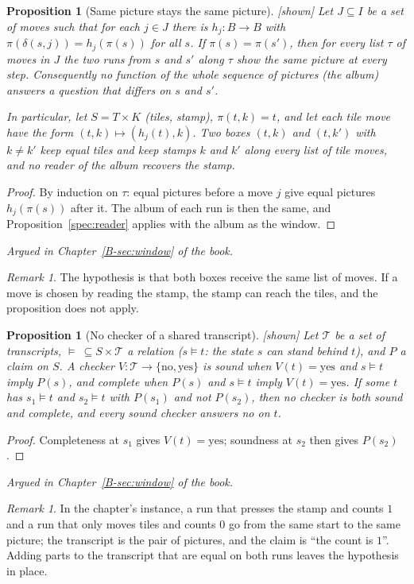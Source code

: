 \documentclass[11pt, a4paper]{article}
\theoremstyle{plain}
\newtheorem{proposition}[theorem]{Proposition}
\theoremstyle{definition}
\theoremstyle{remark}
\newtheorem{remark}[theorem]{Remark}
\newcommand{\Bool}{\{\mathrm{no},\mathrm{yes}\}}
\newcommand{\step}{\delta}
\newcommand{\argued}[1]{\par\noindent\textit{Argued in Chapter~\ref{B-#1} of the book.}\par}
\newcommand{\kind}[1]{\textup{[#1]}}
\begin{document}
\begin{proposition}[Same picture stays the same picture]\label{spec:album} \kind{shown}
Let $J\subseteq I$ be a set of moves such that for each $j\in J$ there is $h_j:B\to B$ with
$\pi(\step(s,j))=h_j(\pi(s))$ for all $s$. If $\pi(s)=\pi(s')$, then for every list $\tau$ of moves in $J$
the two runs from $s$ and $s'$ along $\tau$ show the same picture at every step. Consequently no function
of the whole sequence of pictures (the album) answers a question that differs on $s$ and $s'$.

In particular, let $S=T\times K$ (tiles, stamp), $\pi(t,k)=t$, and let each tile move have the form
$(t,k)\mapsto(h_j(t),k)$. Two boxes $(t,k)$ and $(t,k')$ with $k\ne k'$ keep equal tiles and keep stamps
$k$ and $k'$ along every list of tile moves, and no reader of the album recovers the stamp.
\end{proposition}
\begin{proof}
By induction on $\tau$: equal pictures before a move $j$ give equal pictures $h_j(\pi(s))$ after it. The
album of each run is then the same, and Proposition~\ref{spec:reader} applies with the album as the window.
\end{proof}
\argued{sec:window}

\begin{remark}
The hypothesis is that both boxes receive the same list of moves. If a move is chosen by reading the stamp,
the stamp can reach the tiles, and the proposition does not apply.
\end{remark}

\begin{proposition}[No checker of a shared transcript]\label{spec:transcript} \kind{shown}
Let $\mathcal{T}$ be a set of transcripts, $\models\ \subseteq S\times\mathcal{T}$ a relation ($s\models t$:
the state $s$ can stand behind $t$), and $P$ a claim on $S$. A checker $V:\mathcal{T}\to\Bool$ is
\emph{sound} when $V(t)=\mathrm{yes}$ and $s\models t$ imply $P(s)$, and \emph{complete} when $P(s)$ and
$s\models t$ imply $V(t)=\mathrm{yes}$. If some $t$ has $s_1\models t$ and $s_2\models t$ with $P(s_1)$ and
not $P(s_2)$, then no checker is both sound and complete, and every sound checker answers no on $t$.
\end{proposition}
\begin{proof}
Completeness at $s_1$ gives $V(t)=\mathrm{yes}$; soundness at $s_2$ then gives $P(s_2)$.
\end{proof}
\argued{sec:window}

\begin{remark}
In the chapter's instance, a run that presses the stamp and counts $1$ and a run that only moves tiles and
counts $0$ go from the same start to the same picture; the transcript is the pair of pictures, and the claim
is ``the count is $1$''. Adding parts to the transcript that are equal on both runs leaves the hypothesis in
place.
\end{remark}
\end{document}
